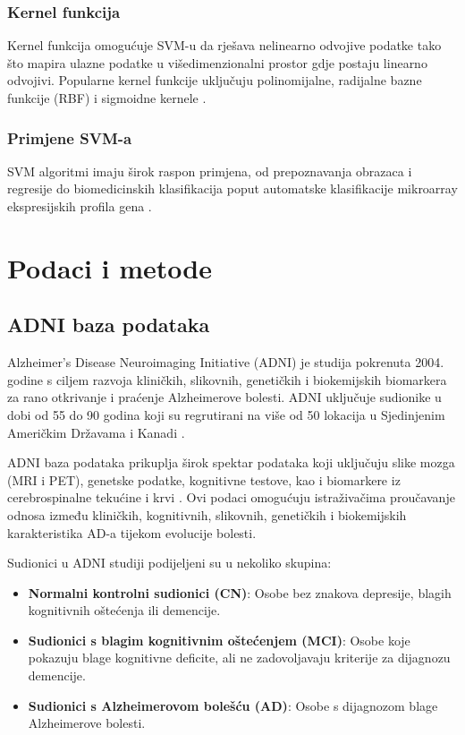 \documentclass[zavrsnirad]{fer}
\begin{document}
\subsection{Kernel funkcija}
Kernel funkcija omogućuje SVM-u da rješava nelinearno odvojive podatke tako što mapira ulazne podatke u višedimenzionalni prostor gdje postaju linearno odvojivi. Popularne kernel funkcije uključuju polinomijalne, radijalne bazne funkcije (RBF) i sigmoidne kernele \cite{Gammermann2000}.

\subsection{Primjene SVM-a}
SVM algoritmi imaju širok raspon primjena, od prepoznavanja obrazaca i regresije do biomedicinskih klasifikacija poput automatske klasifikacije mikroarray ekspresijskih profila gena \cite{Noble2006}.

\chapter{Podaci i metode}
\section{ADNI baza podataka}
Alzheimer's Disease Neuroimaging Initiative (ADNI) je studija pokrenuta 2004. godine s ciljem razvoja kliničkih, slikovnih, genetičkih i biokemijskih biomarkera za rano otkrivanje i praćenje Alzheimerove bolesti. ADNI uključuje sudionike u dobi od 55 do 90 godina koji su regrutirani na više od 50 lokacija u Sjedinjenim Američkim Državama i Kanadi \cite{adni_about}. 

ADNI baza podataka prikuplja širok spektar podataka koji uključuju slike mozga (MRI i PET), genetske podatke, kognitivne testove, kao i biomarkere iz cerebrospinalne tekućine i krvi \cite{adni_about}. Ovi podaci omogućuju istraživačima proučavanje odnosa između kliničkih, kognitivnih, slikovnih, genetičkih i biokemijskih karakteristika AD-a tijekom evolucije bolesti.

Sudionici u ADNI studiji podijeljeni su u nekoliko skupina:

\begin{itemize}
	\item \textbf{Normalni kontrolni sudionici (CN)}: Osobe bez znakova depresije, blagih kognitivnih oštećenja ili demencije.
	\item\textbf{Sudionici s blagim kognitivnim oštećenjem (MCI)}: Osobe koje pokazuju blage kognitivne deficite, ali ne zadovoljavaju kriterije za dijagnozu demencije.
	\item \textbf{Sudionici s Alzheimerovom bolešću (AD)}: Osobe s dijagnozom blage Alzheimerove bolesti.
\end{itemize}
\end{document}
